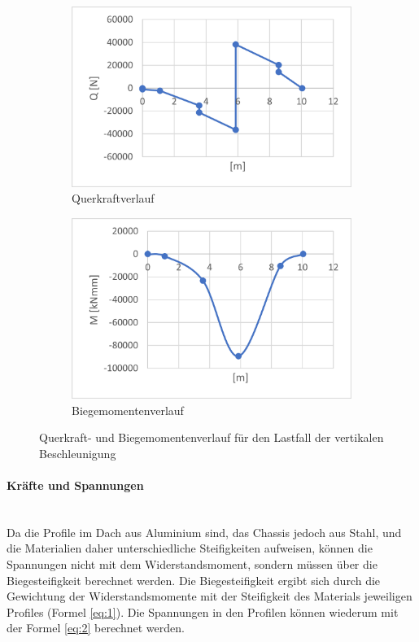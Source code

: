   \begin{figure}[!ht]
    \centering
      \begin{subfigure}{.5\textwidth}
        \centering
        \includegraphics[width=.98\linewidth]{04_figures/1.1 Q.png}
        \caption{Querkraftverlauf}
        \label{1.1 Q}
      \end{subfigure}%
      \begin{subfigure}{.5\textwidth}
        \centering
        \includegraphics[width=.98\linewidth]{04_figures/1.1 M.png}
        \caption{Biegemomentenverlauf}
        \label{1.1 M}
      \end{subfigure}%
    \caption{Querkraft- und Biegemomentenverlauf für den Lastfall der vertikalen Beschleunigung}
  \label{1.1 QM}
  \end{figure}

  \paragraph{Kräfte und Spannungen}\mbox{}\\
  Da die Profile im Dach aus Aluminium sind, das Chassis jedoch aus Stahl, und die Materialien daher unterschiedliche Steifigkeiten aufweisen, können die Spannungen nicht mit dem Widerstandsmoment, sondern müssen über die Biegesteifigkeit berechnet werden. Die Biegesteifigkeit ergibt sich durch die Gewichtung der Widerstandsmomente mit der Steifigkeit des Materials jeweiligen Profiles (Formel \ref{eq:1}). Die Spannungen in den Profilen können wiederum mit der Formel \ref{eq:2} berechnet werden.

